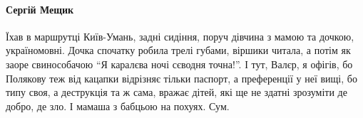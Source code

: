 \paragraph{Сергій Мещик}

Їхав в маршрутці Київ-Умань, задні сидіння, поруч дівчина з мамою та дочкою,
україномовні. Дочка спочатку робила трелі губами, віршики читала, а потім як
заоре свинособачою \enquote{Я каралєва ночі сєводня точна!}. І тут, Валєр, я офігів, бо
Полякову теж від кацапки відрізняє тільки паспорт, а преференції у неї вищі, бо
типу своя, а деструкція та ж сама, вражає дітей, які ще не здатні зрозуміти де
добро, де зло. І мамаша з бабцьою на похуях. Сум.

